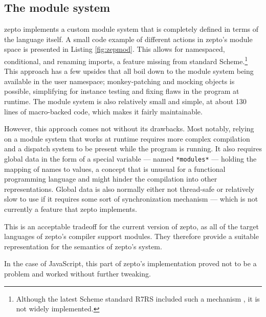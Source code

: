 \documentclass[oneside,11pt,xetex]{scrbook}
\begin{document}
\subsection{The module system}

zepto implements a custom module system that is completely defined in terms of the language
itself. A small code example of different actions in zepto's module space is presented in
Listing \ref{fig:zepmod}.
This allows for namespaced, conditional, and renaming imports, a feature missing from standard
Scheme.\footnote{Although the latest Scheme standard R7RS included such a mechanism \parencite{R7RS},
it is not widely implemented.}
This approach has a few upsides that all boil down to the module system being available in the
user namespace; monkey-patching and mocking objects is possible, simplifying for instance
testing and fixing flaws in the program at runtime. The module system is also relatively small
and simple, at about 130 lines of macro-backed code, which makes it fairly maintainable.

However, this approach comes not without its drawbacks. Most notably, relying on a module
system that works at runtime requires more complex compilation and a dispatch system to
be present while the program is running. It also requires global data in the form of a
special variable --- named \texttt{*modules*} --- holding the mapping of names to values,
a concept that is unusual for a functional programming language and might hinder the
compilation into other representations. Global data is also normally either not thread-safe
or relatively slow to use if it requires some sort of synchronization mechanism --- which is
not currently a feature that zepto implements.

This is an acceptable tradeoff for the current version of zepto, as all of the
target languages of zepto's compiler support modules. They therefore provide a
suitable representation for the semantics of zepto's system.

In the case of JavaScript, this part of zepto's implementation proved not
to be a problem and worked without further tweaking.
\end{document}
